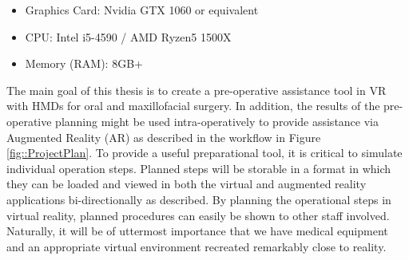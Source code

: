 \begin{itemize}
    \item Graphics Card: Nvidia GTX 1060 or equivalent
    \item CPU: Intel i5-4590 / AMD Ryzen5 1500X
    \item Memory (RAM): 8GB+
\end{itemize}

The main goal of this thesis is to create a pre-operative assistance tool in VR with HMDs for oral and maxillofacial surgery. 
In addition, the results of the pre-operative planning might be used intra-operatively to provide assistance via Augmented Reality (AR) as described in the workflow in Figure \ref{fig::ProjectPlan}.
To provide a useful preparational tool, it is critical to simulate individual operation steps.
Planned steps will be storable in a format in which they can be loaded and viewed in both the virtual and augmented reality applications bi-directionally as described.
By planning the operational steps in virtual reality, planned procedures can easily be shown to other staff involved.
Naturally, it will be of uttermost importance that we have medical equipment and an appropriate virtual environment recreated remarkably close to reality.

